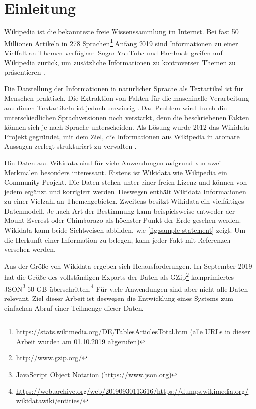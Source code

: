 %
\chapter{Einleitung}
\label{sec:intro}
Wikipedia ist die bekannteste freie Wissenssammlung im Internet.
Bei fast 50 Millionen Artikeln in 278 Sprachen\footnote{\url{https://stats.wikimedia.org/DE/TablesArticlesTotal.htm} (alle URLs in dieser Arbeit wurden am 01.10.2019 abgerufen)} Anfang 2019 sind Informationen zu einer Vielfalt an Themen verfügbar.
Sogar YouTube und Facebook greifen auf Wikipedia zurück, um zusätzliche Informationen zu kontroversen Themen zu präsentieren \cite{youtube-facebook-wp}.

Die Darstellung der Informationen in natürlicher Sprache als Textartikel ist für Menschen praktisch.
Die Extraktion von Fakten für die maschinelle Verarbeitung aus diesen Textartikeln ist jedoch schwierig \cite{oie-errors,extract-rel-ibm}.
Das Problem wird durch die unterschiedlichen Sprachversionen noch verstärkt, denn die beschriebenen Fakten können sich je nach Sprache unterscheiden.
Als Lösung wurde 2012 das Wikidata Projekt gegründet, mit dem Ziel, die Informationen aus Wikipedia in atomare Aussagen zerlegt strukturiert zu verwalten \cite{wikidata}.

Die Daten aus Wikidata sind für viele Anwendungen aufgrund von zwei Merkmalen besonders interessant.
Erstens ist Wikidata wie Wikipedia ein Community-Projekt.
Die Daten stehen unter einer freien Lizenz und können von jedem ergänzt und korrigiert werden.
Deswegen enthält Wikidata Informationen zu einer Vielzahl an Themengebieten.
Zweitens besitzt Wikidata ein vielfältiges Datenmodell.
Je nach Art der Bestimmung kann beispielsweise entweder der Mount Everest oder Chimborazo als höchster Punkt der Erde gesehen werden.
Wikidata kann beide Sichtweisen abbilden, wie \cref{fig:sample-statement} zeigt.
Um die Herkunft einer Information zu belegen, kann jeder Fakt mit Referenzen versehen werden.

Aus der Größe von Wikidata ergeben sich Herausforderungen.
Im September 2019 hat die Größe des vollständigen Exports der Daten als GZip\footnote{\url{http://www.gzip.org/}}-komprimiertes JSON\footnote{JavaScript Object Notation (\url{https://www.json.org})} 60 GB überschritten.\footnote{\url{https://web.archive.org/web/20190930113616/https://dumps.wikimedia.org/wikidatawiki/entities/}}
Für viele Anwendungen sind aber nicht alle Daten relevant.
Ziel dieser Arbeit ist deswegen die Entwicklung eines Systems zum einfachen Abruf einer Teilmenge dieser Daten.

